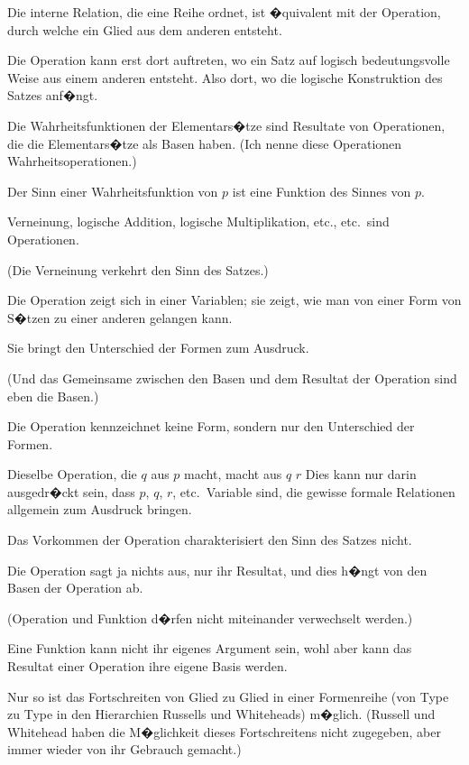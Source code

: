 \begin{propositions}
{Die interne Relation, die eine Reihe ordnet, ist
�quivalent mit der Operation, durch welche ein
Glied aus dem anderen entsteht.}


{Die Operation kann erst dort auftreten, wo ein
Satz auf logisch bedeutungsvolle Weise aus einem
anderen entsteht. Also dort, wo die logische
Konstruktion des Satzes anf�ngt.}


{Die Wahrheitsfunktionen der Elementars�tze
sind Resultate von Operationen, die die Elementars�tze
als Basen haben. (Ich nenne diese Operationen
Wahrheitsoperationen.)}


{Der Sinn einer Wahrheitsfunktion von $p$ ist
eine Funktion des Sinnes von $p$.

Verneinung, logische Addition, logische Multiplikation,
etc., etc.\ sind Operationen.

(Die Verneinung verkehrt den Sinn des Satzes.)}


{Die Operation zeigt sich in einer Variablen;
sie zeigt, wie man von einer Form von S�tzen zu
einer anderen gelangen kann.

Sie bringt den Unterschied der Formen zum
Ausdruck.

(Und das Gemeinsame zwischen den Basen
und dem Resultat der Operation sind eben die
Basen.)}


{Die Operation kennzeichnet keine Form, sondern
nur den Unterschied der Formen.}


{Dieselbe Operation, die \glqq{}$q$\grqq{} aus \glqq{}$p$\grqq{} macht,
macht aus \glqq{}$q$\grqq{} \glqq{}$r$\grqq{} \undSoFort{} Dies kann nur darin
ausgedr�ckt sein, dass \glqq{}$p$\grqq{}, \glqq{}$q$\grqq{}, \glqq{}$r$\grqq{}, etc.\ Variable
sind, die gewisse formale Relationen allgemein
zum Ausdruck bringen.}


{Das Vorkommen der Operation charakterisiert
den Sinn des Satzes nicht.

Die Operation sagt ja nichts aus, nur ihr Resultat,
und dies h�ngt von den Basen der Operation
ab.

(Operation und Funktion d�rfen nicht miteinander
verwechselt werden.)}


{Eine Funktion kann nicht ihr eigenes Argument
sein, wohl aber kann das Resultat einer Operation
ihre eigene Basis werden.}


{Nur so ist das Fortschreiten von Glied zu Glied
in einer Formenreihe (von Type zu Type in den
Hierarchien Russells und Whiteheads) m�glich.
(Russell und Whitehead haben die M�glichkeit
dieses Fortschreitens nicht zugegeben, aber immer
wieder von ihr Gebrauch gemacht.)}



\end{propositions}

